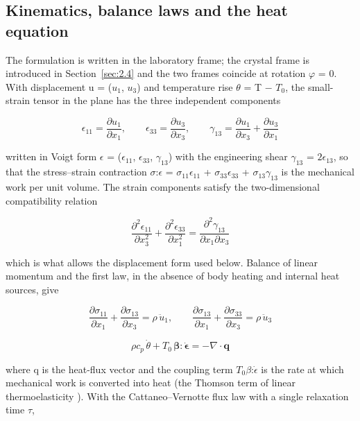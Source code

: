 \documentclass[preprint,12pt]{elsarticle}
\begin{document}
\subsection{Kinematics, balance laws and the heat equation}
\label{sec:2.2}

The formulation is written in the laboratory frame; the crystal frame is introduced in Section~\ref{sec:2.4} and the two frames coincide at rotation $\varphi$ = 0. With displacement u = ($u_{1}$, $u_{3}$) and temperature rise $\theta$ = T $-$ $T_{0}$, the small-strain tensor in the plane has the three independent components

\begin{equation}
\epsilon_{11}=\frac{\partial u_1}{\partial x_1},\qquad \epsilon_{33}=\frac{\partial u_3}{\partial x_3},\qquad \gamma_{13}=\frac{\partial u_1}{\partial x_3}+\frac{\partial u_3}{\partial x_1} 
\label{eq:2}
\end{equation}

written in Voigt form $\epsilon$ = ($\epsilon_{11}$, $\epsilon_{33}$, $\gamma_{13}$) with the engineering shear $\gamma_{13}$ = $2\epsilon_{13}$, so that the stress--strain contraction $\sigma$:$\epsilon$ = $\sigma_{11}\epsilon_{11}$ + $\sigma_{33}\epsilon_{33}$ + $\sigma_{13}\gamma_{13}$ is the mechanical work per unit volume. The strain components satisfy the two-dimensional compatibility relation

\begin{equation}
\frac{\partial^2\epsilon_{11}}{\partial x_3^2}+\frac{\partial^2\epsilon_{33}}{\partial x_1^2}=\frac{\partial^2\gamma_{13}}{\partial x_1\partial x_3} 
\label{eq:3}
\end{equation}

which is what allows the displacement form used below. Balance of linear momentum and the first law, in the absence of body heating and internal heat sources, give

\begin{equation}
\frac{\partial\sigma_{11}}{\partial x_1}+\frac{\partial\sigma_{13}}{\partial x_3}=\rho\,\ddot u_1,\qquad \frac{\partial\sigma_{13}}{\partial x_1}+\frac{\partial\sigma_{33}}{\partial x_3}=\rho\,\ddot u_3 
\label{eq:4}
\end{equation}

\begin{equation}
\rho c_p\,\dot\theta+T_0\,\boldsymbol{\beta}:\dot{\boldsymbol{\epsilon}}=-\nabla\cdot\mathbf{q} 
\label{eq:5}
\end{equation}

where q is the heat-flux vector and the coupling term $T_{0}\beta$:$\dot{\epsilon}$ is the rate at which mechanical work is converted into heat (the Thomson term of linear thermoelasticity \cite{biot1956}). With the Cattaneo--Vernotte flux law with a single relaxation time $\tau$,
\end{document}
